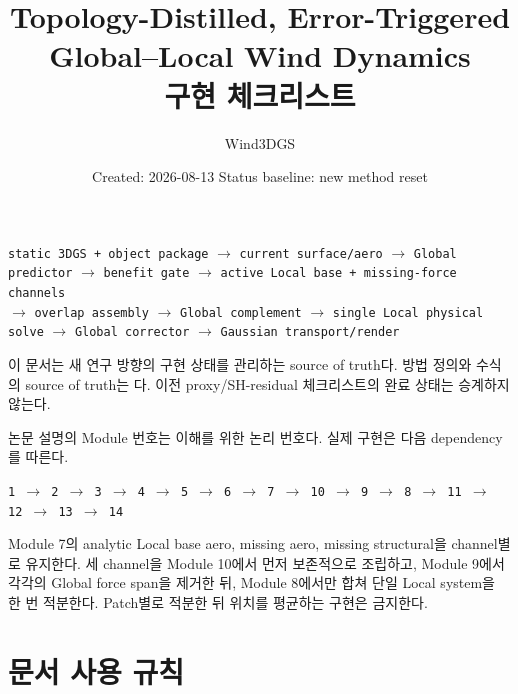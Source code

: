 \documentclass[10pt,a4paper]{article}
\title{\vspace{-1.7em}\textbf{Topology-Distilled, Error-Triggered\\Global--Local Wind Dynamics}\\[0.4em]\Large 구현 체크리스트}
\author{Wind3DGS}
\date{Created: 2026-08-13 \quad Status baseline: new method reset}
\newcommand{\code}[1]{\texttt{#1}}
\begin{document}
\maketitle

\begin{tcolorbox}[
  colback=LightBlue,
  colframe=blue!45!black,
  title=고정 Runtime Pipeline,
  fonttitle=\bfseries
]
\begin{center}
\code{static 3DGS + object package}
\(\rightarrow\)
\code{current surface/aero}
\(\rightarrow\)
\code{Global predictor}
\(\rightarrow\)
\code{benefit gate}
\(\rightarrow\)
\code{active Local base + missing-force channels}
\\[0.25em]
\(\rightarrow\)
\code{overlap assembly}
\(\rightarrow\)
\code{Global complement}
\(\rightarrow\)
\code{single Local physical solve}
\(\rightarrow\)
\code{Global corrector}
\(\rightarrow\)
\code{Gaussian transport/render}
\end{center}

이 문서는 새 연구 방향의 구현 상태를 관리하는 source of truth다.
방법 정의와 수식의 source of truth는
다.
이전 proxy/SH-residual 체크리스트의 완료 상태는 승계하지 않는다.
\end{tcolorbox}

\begin{tcolorbox}[colback=LightRed,colframe=KillRed,title=가장 중요한 실행 순서 계약,fonttitle=\bfseries]
논문 설명의 Module 번호는 이해를 위한 논리 번호다. 실제 구현은 다음 dependency를 따른다.
\begin{center}
\code{1 $\rightarrow$ 2 $\rightarrow$ 3 $\rightarrow$ 4 $\rightarrow$ 5 $\rightarrow$ 6 $\rightarrow$ 7
$\rightarrow$ 10 $\rightarrow$ 9 $\rightarrow$ 8 $\rightarrow$ 11 $\rightarrow$ 12 $\rightarrow$ 13 $\rightarrow$ 14}
\end{center}
Module 7의 analytic Local base aero, missing aero, missing structural을 channel별로 유지한다.
세 channel을 Module 10에서 먼저 보존적으로 조립하고,
Module 9에서 각각의 Global force span을 제거한 뒤, Module 8에서만 합쳐 단일 Local system을 한 번 적분한다.
Patch별로 적분한 뒤 위치를 평균하는 구현은 금지한다.
\end{tcolorbox}

\tableofcontents
\newpage

\section{문서 사용 규칙}
\end{document}
